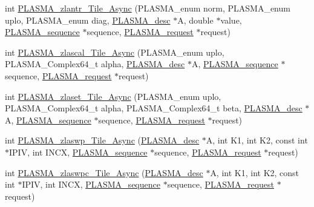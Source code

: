 \begin{DoxyCompactItemize}
\item 
int \hyperlink{group__PLASMA__Complex64__t__Tile__Async_ga0a46e4d19b40b27caaac9d28d8b0399c_ga0a46e4d19b40b27caaac9d28d8b0399c}{P\+L\+A\+S\+M\+A\+\_\+zlantr\+\_\+\+Tile\+\_\+\+Async} (P\+L\+A\+S\+M\+A\+\_\+enum norm, P\+L\+A\+S\+M\+A\+\_\+enum uplo, P\+L\+A\+S\+M\+A\+\_\+enum diag, \hyperlink{structplasma__desc__t}{P\+L\+A\+S\+M\+A\+\_\+desc} $\ast$A, double $\ast$value, \hyperlink{structplasma__sequence__t}{P\+L\+A\+S\+M\+A\+\_\+sequence} $\ast$sequence, \hyperlink{structplasma__request__t}{P\+L\+A\+S\+M\+A\+\_\+request} $\ast$request)
\item 
int \hyperlink{group__PLASMA__Complex64__t__Tile__Async_ga335695edbbd6f7e3f60f4f78ce9c5050_ga335695edbbd6f7e3f60f4f78ce9c5050}{P\+L\+A\+S\+M\+A\+\_\+zlascal\+\_\+\+Tile\+\_\+\+Async} (P\+L\+A\+S\+M\+A\+\_\+enum uplo, P\+L\+A\+S\+M\+A\+\_\+\+Complex64\+\_\+t alpha, \hyperlink{structplasma__desc__t}{P\+L\+A\+S\+M\+A\+\_\+desc} $\ast$A, \hyperlink{structplasma__sequence__t}{P\+L\+A\+S\+M\+A\+\_\+sequence} $\ast$sequence, \hyperlink{structplasma__request__t}{P\+L\+A\+S\+M\+A\+\_\+request} $\ast$request)
\item 
int \hyperlink{group__PLASMA__Complex64__t__Tile__Async_ga2c72b62b08b3a1e461e4dbc4bb7bdd5c_ga2c72b62b08b3a1e461e4dbc4bb7bdd5c}{P\+L\+A\+S\+M\+A\+\_\+zlaset\+\_\+\+Tile\+\_\+\+Async} (P\+L\+A\+S\+M\+A\+\_\+enum uplo, P\+L\+A\+S\+M\+A\+\_\+\+Complex64\+\_\+t alpha, P\+L\+A\+S\+M\+A\+\_\+\+Complex64\+\_\+t beta, \hyperlink{structplasma__desc__t}{P\+L\+A\+S\+M\+A\+\_\+desc} $\ast$A, \hyperlink{structplasma__sequence__t}{P\+L\+A\+S\+M\+A\+\_\+sequence} $\ast$sequence, \hyperlink{structplasma__request__t}{P\+L\+A\+S\+M\+A\+\_\+request} $\ast$request)
\item 
int \hyperlink{group__PLASMA__Complex64__t__Tile__Async_gae0b30a09939da72cfe89fb647c4fe316_gae0b30a09939da72cfe89fb647c4fe316}{P\+L\+A\+S\+M\+A\+\_\+zlaswp\+\_\+\+Tile\+\_\+\+Async} (\hyperlink{structplasma__desc__t}{P\+L\+A\+S\+M\+A\+\_\+desc} $\ast$A, int K1, int K2, const int $\ast$I\+P\+I\+V, int I\+N\+C\+X, \hyperlink{structplasma__sequence__t}{P\+L\+A\+S\+M\+A\+\_\+sequence} $\ast$sequence, \hyperlink{structplasma__request__t}{P\+L\+A\+S\+M\+A\+\_\+request} $\ast$request)
\item 
int \hyperlink{group__PLASMA__Complex64__t__Tile__Async_ga4a913e8804cf6f2ac6eacc229a1388e8_ga4a913e8804cf6f2ac6eacc229a1388e8}{P\+L\+A\+S\+M\+A\+\_\+zlaswpc\+\_\+\+Tile\+\_\+\+Async} (\hyperlink{structplasma__desc__t}{P\+L\+A\+S\+M\+A\+\_\+desc} $\ast$A, int K1, int K2, const int $\ast$I\+P\+I\+V, int I\+N\+C\+X, \hyperlink{structplasma__sequence__t}{P\+L\+A\+S\+M\+A\+\_\+sequence} $\ast$sequence, \hyperlink{structplasma__request__t}{P\+L\+A\+S\+M\+A\+\_\+request} $\ast$request)

\end{DoxyCompactItemize}
